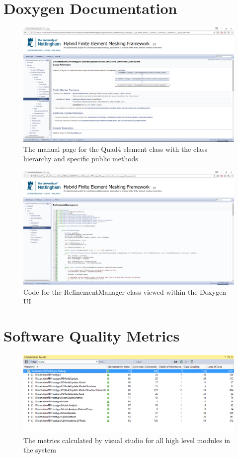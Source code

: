 \section{Doxygen Documentation}
\begin{figure}[H]
  \centerline{\includegraphics[width=165mm,  scale=0.5]{../Graphics/Doxygen/Quad4Element.png}}
  \caption{The manual page for the Quad4 element class with the class hierarchy and specific public methods}
\end{figure}

\begin{figure}[H]
  \centerline{\includegraphics[width=165mm,  scale=0.5]{../Graphics/Doxygen/RefinementManager.png}}
  \caption{Code for the RefinementManager class viewed within the Doxygen UI}
\end{figure}



\section{Software Quality Metrics}
\begin{figure}[H]
  \centerline{\includegraphics[width=165mm, scale=0.5]{../Graphics/softwareQualityMetrics.png}}
  \caption{The metrics calculated by visual studio for all high level modules in the system}
\end{figure}

